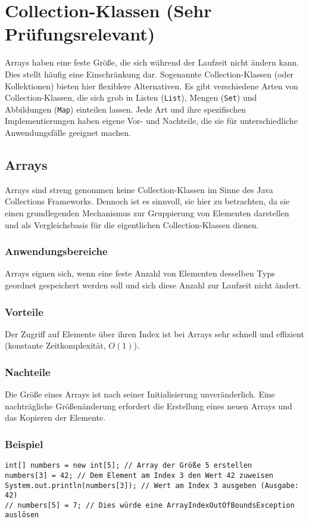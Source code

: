 \chapter{Collection-Klassen (Sehr Prüfungsrelevant)}
\label{chap:CollectionKlassen}

Arrays haben eine feste Größe, die sich während der Laufzeit nicht ändern kann.
Dies stellt häufig eine Einschränkung dar. Sogenannte Collection-Klassen (oder
Kollektionen) bieten hier flexiblere Alternativen. Es gibt verschiedene Arten
von Collection-Klassen, die sich grob in Listen (\texttt{List}), Mengen
(\texttt{Set}) und Abbildungen (\texttt{Map}) einteilen lassen. Jede Art und
ihre spezifischen Implementierungen haben eigene Vor- und Nachteile, die sie
für unterschiedliche Anwendungsfälle geeignet machen.

\section{Arrays}
Arrays sind streng genommen keine Collection-Klassen im Sinne des Java
Collections Frameworks. Dennoch ist es sinnvoll, sie hier zu betrachten, da sie
einen grundlegenden Mechanismus zur Gruppierung von Elementen darstellen und
als Vergleichsbasis für die eigentlichen Collection-Klassen dienen.

\subsection{Anwendungsbereiche}
Arrays eignen sich, wenn eine feste Anzahl von Elementen desselben Typs
geordnet gespeichert werden soll und sich diese Anzahl zur Laufzeit nicht
ändert.

\subsection{Vorteile}
Der Zugriff auf Elemente über ihren Index ist bei Arrays sehr schnell und
effizient (konstante Zeitkomplexität, $O(1)$).

\subsection{Nachteile}
Die Größe eines Arrays ist nach seiner Initialisierung unveränderlich. Eine
nachträgliche Größenänderung erfordert die Erstellung eines neuen Arrays und
das Kopieren der Elemente.

\subsection{Beispiel}
\begin{lstlisting}[caption={Beispiel für die Verwendung eines Arrays in Java}, label=lst:arrayExample]
int[] numbers = new int[5]; // Array der Größe 5 erstellen
numbers[3] = 42; // Dem Element am Index 3 den Wert 42 zuweisen
System.out.println(numbers[3]); // Wert am Index 3 ausgeben (Ausgabe: 42)
// numbers[5] = 7; // Dies würde eine ArrayIndexOutOfBoundsException auslösen
\end{lstlisting}

